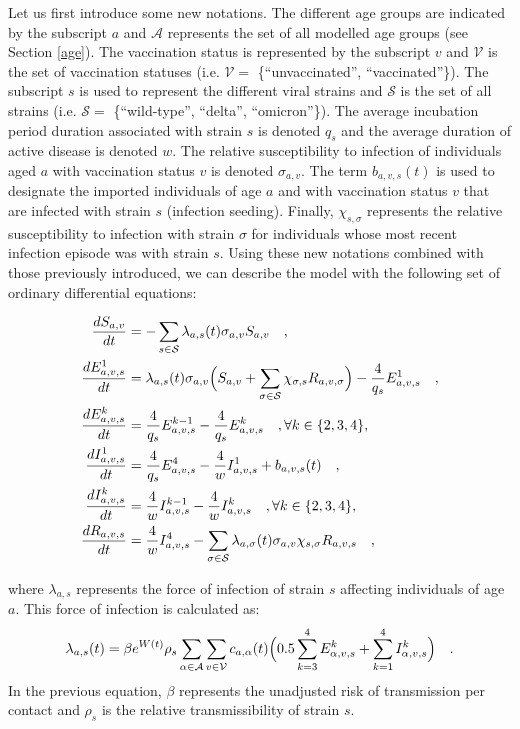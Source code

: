 Let us first introduce some new notations. The different age groups are indicated by the subscript $a$ and $\mathcal{A}$ represents
the set of all modelled age groups (see Section \ref{age}). The vaccination status is represented by the subscript $v$ and $\mathcal{V}$ is the set of 
vaccination statuses (i.e. $\mathcal{V}=$ \{``unvaccinated'', ``vaccinated''\}). The subscript $s$ is used to represent the different viral strains and $\mathcal{S}$ is the set 
of all strains (i.e. $\mathcal{S}=$ \{``wild-type'', ``delta'', ``omicron''\}). The average incubation period duration associated with strain $s$ is denoted $q_s$ and
the average duration of active disease is denoted $w$. The relative susceptibility to infection of individuals aged $a$ with 
vaccination status $v$ is denoted $\sigma_{a,v}$. The term $b_{a,v,s}(t)$ is used to designate the imported individuals of age $a$ and 
with vaccination status $v$ that are infected with strain $s$ (infection seeding). Finally, $\chi_{s,\sigma}$ represents the relative susceptibility to infection
with strain $\sigma$ for individuals whose most recent infection episode was with strain $s$. Using these new notations combined 
with those previously introduced, we can describe the model with the following set of ordinary differential equations:

\begin{equation}
    \label{ode}
    \begin{split}
\frac{dS_{a,v}}{dt} & = -\sum_{s \in \mathcal{S}} \lambda_{a,s}(t)\sigma_{a,v} S_{a,v} \quad , \\
\frac{dE_{a,v,s}^{1}}{dt} & =\lambda_{a,s}(t)\sigma_{a,v} \Bigl(S_{a,v}  +  \sum_{\sigma \in \mathcal{S}} \chi_{\sigma, s} R_{a,v,\sigma} \Bigr) - \frac{4}{q_{s}}E_{a,v,s}^{1} \quad , \\
\frac{dE_{a,v,s}^{k}}{dt} & = \frac{4}{q_{s}}E_{a,v,s}^{k-1} - \frac{4}{q_{s}}E_{a,v,s}^{k} \quad,  \forall k \in \{2,3,4\} , \\
\frac{dI_{a,v,s}^{1}}{dt} & = \frac{4}{q_{s}}E_{a,v,s}^{4} - \frac{4}{w}I_{a,v,s}^{1} + b_{a,v,s}(t) \quad , \\
\frac{dI_{a,v,s}^{k}}{dt} & = \frac{4}{w}I_{a,v,s}^{k-1} - \frac{4}{w}I_{a,v,s}^{k} \quad, \forall k \in \{2,3,4\} , \\
\frac{dR_{a,v,s}}{dt} & = \frac{4}{w}I_{a,v,s}^{4} - \sum _{\sigma \in \mathcal{S}} \lambda_{a,\sigma}(t)\sigma_{a,v} \chi_{s, \sigma} R_{a,v, s} \quad, 
    \end{split}
\end{equation}

where $\lambda_{a,s}$ represents the force of infection of strain $s$ affecting individuals of age $a$. This force of infection
is calculated as:
\begin{equation}
    \label{foi}
 \lambda_{a,s}(t) = \beta e^{W(t)} \rho_{s} \sum_{\alpha \in \mathcal{A}} \sum_{v \in \mathcal{V}} c_{a,\alpha}(t) \Bigl( 0.5 \sum_{k=3}^{4} E_{\alpha,v,s}^{k} + \sum_{k=1}^{4} I_{\alpha,v,s}^{k} \Bigr) \quad .
\end{equation}
In the previous equation, $\beta$ represents the unadjusted risk of transmission per contact and $\rho_{s}$ is the relative transmissibility of strain $s$.